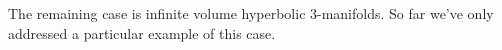 \documentclass[12pt]{amsart}
\theoremstyle{definition}
\begin{document}
The remaining case is infinite volume hyperbolic 3-manifolds. So far we've only
addressed a particular example of this case.

%
%
%
%
%
%
\end{document}
